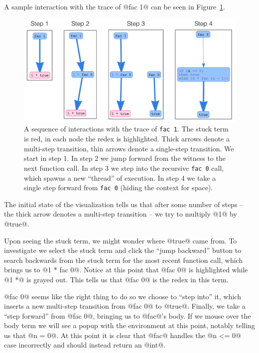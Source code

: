 A sample interaction with the trace of @fac 1@ can be seen in
Figure~\ref{fig:nanomaly-factorial}.
%
\begin{figure}[t]
\centering
\includegraphics[width=0.8\linewidth]{fac-steps.png}
\caption{A sequence of interactions with the trace of 
  \texttt{fac 1}. The stuck term is red, in each node the redex is
  highlighted. Thick arrows denote a multi-step transition, thin arrows
  denote a single-step transition. We start in step 1. In step 2 we jump
  forward from the witness to the next function call. In step 3 we step
  into the recursive \texttt{fac 0} call, which spawns a new ``thread''
  of execution. In step 4 we take a single step forward from 
  \texttt{fac 0} (hiding the context for space).}
\label{fig:nanomaly-factorial}
\end{figure}
%
The initial state of the visualization tells us that after some number
of steps -- the thick arrow denotes a multi-step transition -- we try to
multiply @1@ by @true@.

Upon seeing the stuck term, we might wonder where @true@ came from.
%
To investigate we select the stuck term and click the ``jump backward''
button to search backwards from the stuck term for the most recent
function call, which brings us to @1 * fac 0@. Notice at this point that
@fac 0@ is highlighted while @1 *@ is grayed out. This tells us that
@fac 0@ is the redex in this term.

@fac 0@ seems like the right thing to do so we choose to ``step into''
it, which inserts a new multi-step transition from @fac 0@ to @true@.
%
Finally, we take a ``step forward'' from @fac 0@, bringing us to @fac@'s
body. If we mouse over the body term we will see a popup with the
environment at this point, notably telling us that @n = 0@. At this point
it is clear that @fac@ handles the @n <= 0@ case incorrectly and should
instead return an @int@.


